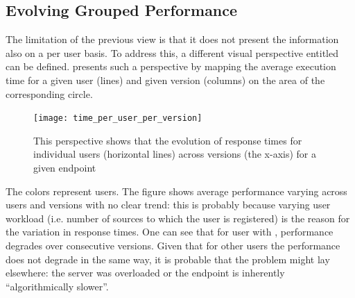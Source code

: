 \subsection*{Evolving Grouped Performance}
  The limitation of the previous view is that it does not present the information also on a per user basis. To address this, a different visual perspective entitled  can be defined.  presents such a perspective by mapping the average execution time for a given user (lines) and given version (columns) on the area of the corresponding circle. 

\begin{figure}[h!]
  \centering
  \texttt{[image: time\_per\_user\_per\_version]}
  \caption{This perspective shows that the evolution of response times for individual users (horizontal lines) across versions (the x-axis) for a given endpoint}
  \label{fig:tuv}
\end{figure}


The colors represent users. The figure shows average performance varying  across users and versions with no clear trend: this is probably because varying user workload (i.e. number of sources to which the user is registered) is the reason for the variation in response times. One can see that for user with , performance degrades over consecutive versions. Given that for other users the performance does not degrade in the same way, it is probable that the problem might lay elsewhere: the server was overloaded or the endpoint is inherently ``algorithmically slower''. 


  
